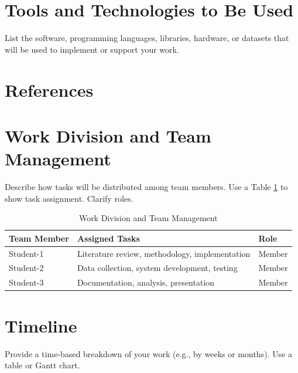 \documentclass[12pt,a4paper]{article}
\begin{document}

\section{Tools and Technologies to Be Used}

List the software, programming languages, libraries, hardware, or datasets
that will be used to implement or support your work.


\section{References}

\renewcommand{\refname}{}



\section{Work Division and Team Management}

Describe how tasks will be distributed among team members. Use a Table \ref{tab:work-division} to show task assignment. Clarify roles.

\begin{table}[H]
\centering
\caption{Work Division and Team Management}
\label{tab:work-division}
\begin{tabularx}{\textwidth}{|p{1.25in}|X|p{1.4in}|}
\hline
\textbf{Team Member} &
\textbf{Assigned Tasks} &
\textbf{Role} \\
\hline

Student-1 &
Literature review, methodology, implementation &
Member \\
\hline

Student-2 &
Data collection, system development, testing &
Member \\
\hline

Student-3 &
Documentation, analysis, presentation &
Member \\
\hline

\end{tabularx}
\end{table}


\section{Timeline}

Provide a time-based breakdown of your work (e.g., by weeks or months).
Use a table or Gantt chart.
\end{document}
